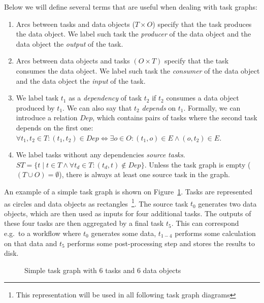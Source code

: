 Below we will define several terms that are useful when dealing with task graphs:
\begin{enumerate}
    \item Arcs between tasks and data objects ($T \times{} O$) specify that the task produces the data
    object. We label such task the \emph{producer} of the data object and the data object the
    \emph{output} of the task.
    \item Arcs between data objects and tasks $(O \times{} T)$ specify that the task consumes the data
    object. We label such task the \emph{consumer} of the data object and the data object the
    \emph{input} of the task.

    \item We label task $t_1$ as a \emph{dependency} of task $t_2$ if
    $t_2$ consumes a data object produced by $t_1$. We can also say
    that $t_2$ \emph{depends} on $t_1$. Formally, we can
    introduce a relation $Dep$, which contains pairs of tasks where the second task
    depends on the first one: $\forall t_1,t_2 \in T: (t_1, t_2)\in{}Dep \Leftrightarrow
    \exists{}o\in{}O: (t_1, o)\in{}E
    \land (o, t_2)\in{}E$.

    \item We label tasks without any dependencies \emph{source tasks}. $ST = \{ t \mid t\in{}T \land \forall{}t_d\in{}T:
    (t_d, t)\notin Dep\}$. Unless the
    task graph is empty ($(T\cup{}O) = \emptyset$), there is always at least one source task in the
    graph.
\end{enumerate}

An example of a simple task graph is shown on Figure~\ref{fig:task-graph-example}. Tasks are represented
as circles and data objects as rectangles~\footnote{This representation will be used in all following task graph diagrams}. The source task
$t_0$ generates two data objects, which are then used as inputs for four
additional tasks. The outputs of these four tasks are then aggregated by a final task
$t_5$. This can correspond e.g.\ to a workflow where $t_0$
generates some data, $t_{1-4}$ performs some calculation on that data and
$t_5$ performs some post-processing step and stores the results to disk.

\begin{figure}[h]
    \centering
    \caption{Simple task graph with 6 tasks and 6 data objects}
    \label{fig:task-graph-example}
\end{figure}

